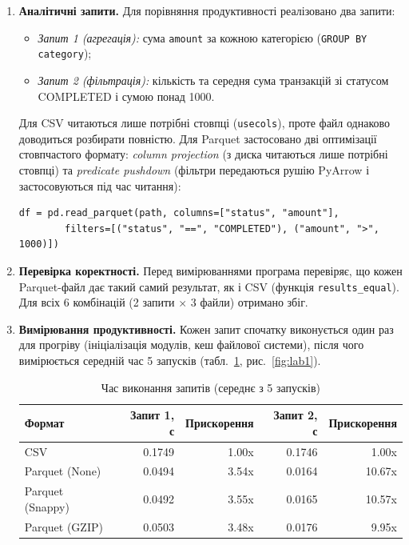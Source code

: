 \begin{enumerate}
  Навіть без стиснення Parquet майже вдвічі менший за CSV. Числа зберігаються у бінарному вигляді, а не як текст, а стовпці з малою кількістю різних значень (\texttt{category}, \texttt{status}) кодуються словником (dictionary encoding). Стиснення додатково ефективне саме у стовпчастому форматі, бо однотипні значення одного стовпця лежать поруч.

  \item \textbf{Аналітичні запити.} Для порівняння продуктивності реалізовано два запити:
  \begin{itemize}
    \item \emph{Запит 1 (агрегація):} сума \texttt{amount} за кожною категорією (\texttt{GROUP BY category});
    \item \emph{Запит 2 (фільтрація):} кількість та середня сума транзакцій зі статусом COMPLETED і сумою понад 1000.
  \end{itemize}
  Для CSV читаються лише потрібні стовпці (\texttt{usecols}), проте файл однаково доводиться розбирати повністю. Для Parquet застосовано дві оптимізації стовпчастого формату: \emph{column projection} (з диска читаються лише потрібні стовпці) та \emph{predicate pushdown} (фільтри передаються рушію PyArrow і застосовуються під час читання):
\begin{Verbatim}
df = pd.read_parquet(path, columns=["status", "amount"],
        filters=[("status", "==", "COMPLETED"), ("amount", ">", 1000)])
\end{Verbatim}

  \item \textbf{Перевірка коректності.} Перед вимірюваннями програма перевіряє, що кожен Parquet-файл дає такий самий результат, як і CSV (функція \texttt{results\_equal}). Для всіх 6 комбінацій (2 запити \(\times\) 3 файли) отримано збіг.

  \item \textbf{Вимірювання продуктивності.} Кожен запит спочатку виконується один раз для прогріву (ініціалізація модулів, кеш файлової системи), після чого вимірюється середній час 5 запусків (табл.~\ref{tab:speed}, рис.~\ref{fig:lab1}).

\begin{table}[H]
\centering
\caption{Час виконання запитів (середнє з 5 запусків)}
\label{tab:speed}
\begin{tabular}{lrrrr}
\toprule
Формат & Запит 1, с & Прискорення & Запит 2, с & Прискорення \\
\midrule
CSV & 0.1749 & 1.00x & 0.1746 & 1.00x \\
Parquet (None) & 0.0494 & 3.54x & 0.0164 & 10.67x \\
Parquet (Snappy) & 0.0492 & 3.55x & 0.0165 & 10.57x \\
Parquet (GZIP) & 0.0503 & 3.48x & 0.0176 & 9.95x \\
\bottomrule
\end{tabular}
\end{table}


\end{enumerate}
